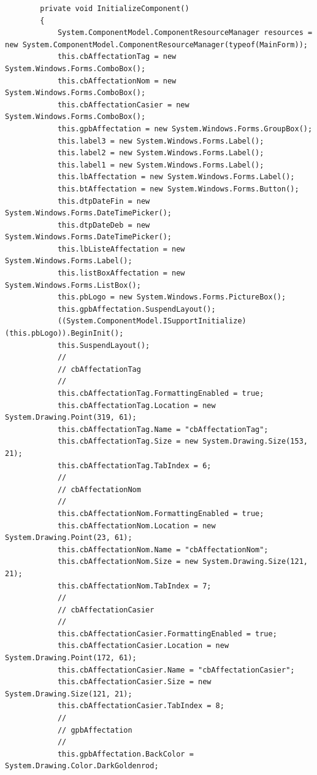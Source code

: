 \documentclass[main.tex]{subfiles}
\begin{document}
\begin{lstlisting}
        private void InitializeComponent()
        {
            System.ComponentModel.ComponentResourceManager resources = new System.ComponentModel.ComponentResourceManager(typeof(MainForm));
            this.cbAffectationTag = new System.Windows.Forms.ComboBox();
            this.cbAffectationNom = new System.Windows.Forms.ComboBox();
            this.cbAffectationCasier = new System.Windows.Forms.ComboBox();
            this.gpbAffectation = new System.Windows.Forms.GroupBox();
            this.label3 = new System.Windows.Forms.Label();
            this.label2 = new System.Windows.Forms.Label();
            this.label1 = new System.Windows.Forms.Label();
            this.lbAffectation = new System.Windows.Forms.Label();
            this.btAffectation = new System.Windows.Forms.Button();
            this.dtpDateFin = new System.Windows.Forms.DateTimePicker();
            this.dtpDateDeb = new System.Windows.Forms.DateTimePicker();
            this.lbListeAffectation = new System.Windows.Forms.Label();
            this.listBoxAffectation = new System.Windows.Forms.ListBox();
            this.pbLogo = new System.Windows.Forms.PictureBox();
            this.gpbAffectation.SuspendLayout();
            ((System.ComponentModel.ISupportInitialize)(this.pbLogo)).BeginInit();
            this.SuspendLayout();
            // 
            // cbAffectationTag
            // 
            this.cbAffectationTag.FormattingEnabled = true;
            this.cbAffectationTag.Location = new System.Drawing.Point(319, 61);
            this.cbAffectationTag.Name = "cbAffectationTag";
            this.cbAffectationTag.Size = new System.Drawing.Size(153, 21);
            this.cbAffectationTag.TabIndex = 6;
            // 
            // cbAffectationNom
            // 
            this.cbAffectationNom.FormattingEnabled = true;
            this.cbAffectationNom.Location = new System.Drawing.Point(23, 61);
            this.cbAffectationNom.Name = "cbAffectationNom";
            this.cbAffectationNom.Size = new System.Drawing.Size(121, 21);
            this.cbAffectationNom.TabIndex = 7;
            // 
            // cbAffectationCasier
            // 
            this.cbAffectationCasier.FormattingEnabled = true;
            this.cbAffectationCasier.Location = new System.Drawing.Point(172, 61);
            this.cbAffectationCasier.Name = "cbAffectationCasier";
            this.cbAffectationCasier.Size = new System.Drawing.Size(121, 21);
            this.cbAffectationCasier.TabIndex = 8;
            // 
            // gpbAffectation
            // 
            this.gpbAffectation.BackColor = System.Drawing.Color.DarkGoldenrod;

\end{lstlisting}
\end{document}
